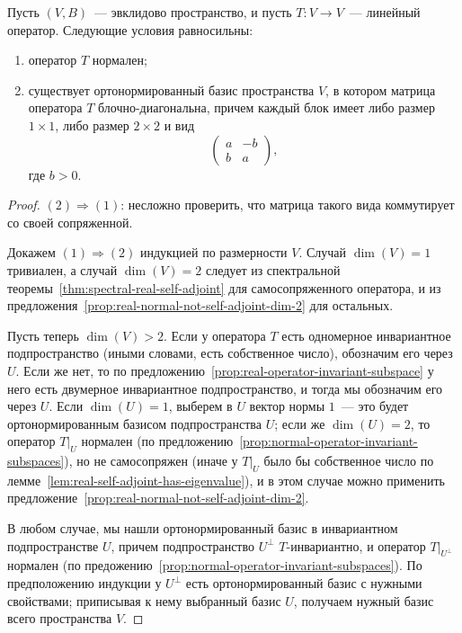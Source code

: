 \begin{theorem}\label{thm:spectral-euclidean}
Пусть $(V,B)$~--- эвклидово пространство, и пусть $T\colon V\to V$~---
линейный оператор.
Следующие условия равносильны:
\begin{enumerate}
\item оператор $T$ нормален;
\item существует ортонормированный базис пространства $V$, в котором
матрица оператора $T$ блочно-диагональна, причем каждый блок имеет
либо размер $1\times 1$, либо размер $2\times 2$ и вид
$$
\begin{pmatrix} a & -b \\ b & a\end{pmatrix},
$$
где $b > 0$.
\end{enumerate}
\end{theorem}
\begin{proof}
$(2)\Rightarrow (1)$: несложно проверить, что матрица такого вида
коммутирует со своей сопряженной.

Докажем $(1)\Rightarrow (2)$ индукцией по размерности $V$.
Случай $\dim(V)=1$ тривиален, а случай $\dim(V) = 2$ следует из
спектральной теоремы~\ref{thm:spectral-real-self-adjoint} для
самосопряженного оператора, и из
предложения~\ref{prop:real-normal-not-self-adjoint-dim-2}
для остальных.

Пусть теперь $\dim(V) > 2$.
Если у оператора $T$ есть одномерное инвариантное подпространство
(иными словами, есть собственное число), обозначим его через $U$.
Если же нет, то 
по предложению~\ref{prop:real-operator-invariant-subspace} у него
есть двумерное инвариантное подпространство, и тогда мы обозначим его
через $U$.
Если $\dim(U) = 1$, выберем в $U$ вектор нормы $1$~--- это будет
ортонормированным базисом подпространства $U$; если же $\dim(U) = 2$,
то оператор $T|_U$ нормален
(по предложению~\ref{prop:normal-operator-invariant-subspaces}), но не
самосопряжен (иначе у $T|_U$ было бы собственное число
по лемме~\ref{lem:real-self-adjoint-has-eigenvalue}), и в этом случае
можно применить
предложение~\ref{prop:real-normal-not-self-adjoint-dim-2}.

В любом случае, мы нашли ортонормированный базис в инвариантном
подпространстве $U$, причем подпространство $U^\perp$ $T$-инвариантно,
и оператор $T|_{U^\perp}$ нормален
(по предожению~\ref{prop:normal-operator-invariant-subspaces}).
По предположению индукции у $U^\perp$ есть ортонормированный базис с
нужными свойствами; приписывая к нему выбранный базис $U$,
получаем нужный базис всего пространства $V$.
\end{proof}


